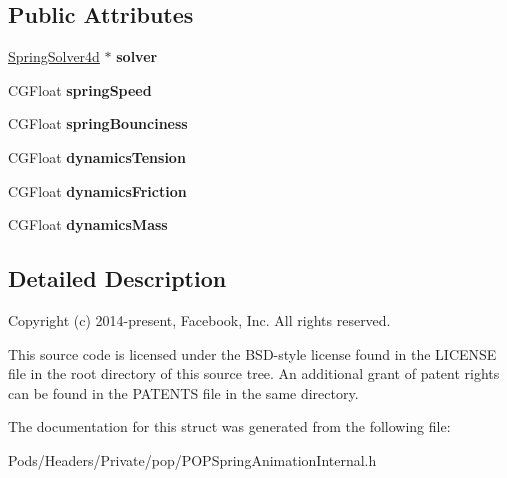 \subsection*{Public Attributes}
\begin{DoxyCompactItemize}
\item 
\mbox{\label{struct___p_o_p_spring_animation_state_a0414f32018348939a93d04718cc7769b}} 
\mbox{\hyperlink{class_p_o_p_1_1_spring_solver}{Spring\+Solver4d}} $\ast$ {\bfseries solver}
\item 
\mbox{\label{struct___p_o_p_spring_animation_state_a7467a168762e1692e5df6a192f1df50a}} 
C\+G\+Float {\bfseries spring\+Speed}
\item 
\mbox{\label{struct___p_o_p_spring_animation_state_a9c4078dc2e388a832994a60b4bafd315}} 
C\+G\+Float {\bfseries spring\+Bounciness}
\item 
\mbox{\label{struct___p_o_p_spring_animation_state_a98f256f702b630b3a6d5196f7d3169e0}} 
C\+G\+Float {\bfseries dynamics\+Tension}
\item 
\mbox{\label{struct___p_o_p_spring_animation_state_abf4c107c30d42a1f8c9cc8d9c31f51c1}} 
C\+G\+Float {\bfseries dynamics\+Friction}
\item 
\mbox{\label{struct___p_o_p_spring_animation_state_aa74ee196c80acdd802cddd282d329609}} 
C\+G\+Float {\bfseries dynamics\+Mass}
\end{DoxyCompactItemize}


\subsection{Detailed Description}
Copyright (c) 2014-\/present, Facebook, Inc. All rights reserved.

This source code is licensed under the B\+S\+D-\/style license found in the L\+I\+C\+E\+N\+SE file in the root directory of this source tree. An additional grant of patent rights can be found in the P\+A\+T\+E\+N\+TS file in the same directory. 

The documentation for this struct was generated from the following file\+:\begin{DoxyCompactItemize}
\item 
Pods/\+Headers/\+Private/pop/P\+O\+P\+Spring\+Animation\+Internal.\+h\end{DoxyCompactItemize}
